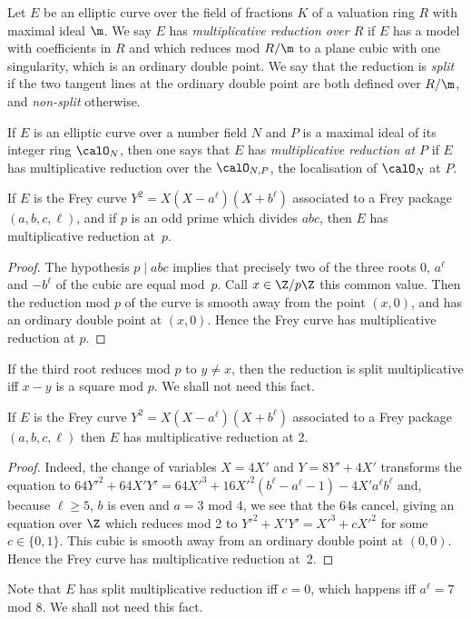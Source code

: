 \begin{definition}\label{EllipticCurve.MultiplicativeReduction} Let $E$ be an elliptic curve over the field of fractions $K$ of a valuation ring $R$ with maximal ideal $\m$. We say $E$ has \emph{multiplicative reduction over $R$} if $E$ has a model with coefficients in $R$ and which reduces mod $R/\m$ to a plane cubic with one singularity, which is an ordinary double point.
  We say that the reduction is \emph{split} if the two tangent lines at the ordinary double point
  are both defined over $R/\m$, and \emph{non-split} otherwise.
\end{definition}

  If $E$ is an elliptic curve
  over a number field $N$ and $P$ is a maximal ideal of its integer ring $\calO_N$, then one says that $E$ has \emph{multiplicative reduction at $P$} if $E$ has multiplicative reduction over the $\calO_{N,P}$, the localisation of $\calO_N$ at $P$.

\begin{lemma}\label{Frey_curve_mult_reduction} If $E$ is the Frey curve $Y^2=X(X-a^\ell)(X+b^\ell)$ associated to a Frey
  package $(a,b,c,\ell)$, and if $p$ is an odd prime
  which divides $abc$, then $E$ has multiplicative reduction at~$p$.
\end{lemma}
\begin{proof} The hypothesis $p\mid abc$ implies that precisely two of the three roots $0$, $a^\ell$ and $-b^\ell$
  of the cubic are equal mod~$p$. Call $x\in\Z/p\Z$ this common value. Then the reduction mod $p$ of
  the curve is smooth away from the point $(x,0)$,
  and has an ordinary double point at $(x,0)$. Hence the Frey curve has
  multiplicative reduction at $p$.
\end{proof}
\begin{remark} If the third root reduces mod $p$ to $y\not=x$, then the reduction
  is split multiplicative iff $x-y$ is a square mod $p$. We shall not need this fact.
\end{remark}

\begin{lemma}\label{Frey_curve_mult_reduction_at_two}  If $E$ is the Frey curve $Y^2=X(X-a^\ell)(X+b^\ell)$ associated to a Frey package
  $(a,b,c,\ell)$ then $E$ has multiplicative reduction at 2.
\end{lemma}
\begin{proof} Indeed, the change of variables $X=4X'$
  and $Y=8Y'+4X'$ transforms the equation to
  $64Y'^2+64X'Y'=64X'^3+16X'^2(b^\ell-a^\ell-1)-4X'a^\ell b^\ell$ and, because $\ell\geq5$,
  $b$ is even and $a=3$ mod 4, we see that the 64s cancel, giving an equation over $\Z$ which reduces mod 2 to
  $Y'^2+X'Y'=X'^3+cX'^2$ for some $c\in\{0,1\}$. This cubic is smooth away from an ordinary
  double point at $(0,0)$. Hence the Frey curve has multiplicative reduction at~2.
\end{proof}
\begin{remark} Note that $E$ has split multiplicative reduction iff $c=0$, which happens iff $a^\ell=7$ mod $8$. We shall not need this fact.
\end{remark}

